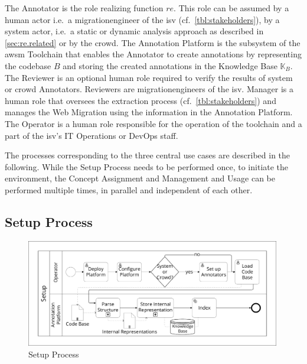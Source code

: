 The Annotator is the role realizing function \(re\).
This role can be assumed by a human actor i.e.~a \gls{migrationengineer} of the \gls{isv} (cf.~\cref{tbl:stakeholders}), by a system actor, i.e.~a static or dynamic analysis approach as described in \cref{sec:re.related} or by the crowd.
The Annotation Platform is the subsystem of the \gls{awsm} Toolchain that enables the Annotator to create annotations by representing the codebase \(B\) and storing the created annotations in the Knowledge Base \(\mathbb{K}_{B}\).
The Reviewer is an optional human role required to verify the results of system or crowd Annotators.
Reviewers are \glspl{migrationengineer} of the \gls{isv}.
Manager is a human role that oversees the extraction process (cf.~\cref{tbl:stakeholders}) and manages the \gls{Web Migration} using the information in the Annotation Platform.
The Operator is a human role responsible for the operation of the toolchain and a part of the \gls{isv}'s IT Operations or DevOps staff.

The processes corresponding to the three central use cases are described in the following.
While the Setup Process needs to be performed once, to initiate the environment, the \gls{Concept Assignment} and Management and Usage can be performed multiple times, in parallel and independent of each other.

\vspace{-25pt}
\subsection{Setup Process}
\vspace{10pt}

\begin{figure}[h!]
\hypertarget{fig:awsm.re.setup}{%
\centering
\includegraphics[width=0.99\textwidth]{../figures/awsm-re-setup.pdf}
\caption{Setup Process}\label{fig:awsm.re.setup}
}
\end{figure}

